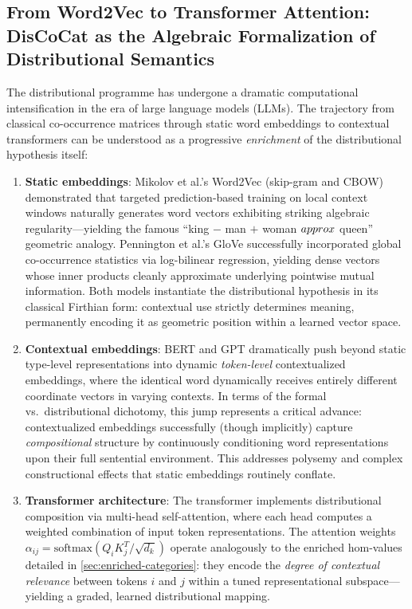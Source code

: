 \documentclass[
]{article}
\begin{document}
\subsection{From Word2Vec to Transformer Attention: DisCoCat as the
Algebraic Formalization of Distributional
Semantics}\label{from-word2vec-to-transformer-attention-discocat-as-the-algebraic-formalization-of-distributional-semantics}

The distributional programme has undergone a dramatic computational
intensification in the era of large language models (LLMs). The
trajectory from classical co-occurrence matrices through static word
embeddings to contextual transformers can be understood as a progressive
\emph{enrichment} of the distributional hypothesis itself:

\begin{enumerate}
\def\labelenumi{\arabic{enumi}.}
\item
  \textbf{Static embeddings}: Mikolov et al.'s
  \citeyearpar{mikolov2013efficient} Word2Vec (skip-gram and CBOW)
  demonstrated that targeted prediction-based training on local context
  windows naturally generates word vectors exhibiting striking algebraic
  regularity---yielding the famous ``king \(-\) man \(+\) woman
  \(\\approx\) queen'' geometric analogy. Pennington et al.'s
  \citeyearpar{pennington2014glove} GloVe successfully incorporated
  global co-occurrence statistics via log-bilinear regression, yielding
  dense vectors whose inner products cleanly approximate underlying
  pointwise mutual information. Both models instantiate the
  distributional hypothesis in its classical Firthian form: contextual
  use strictly determines meaning, permanently encoding it as geometric
  position within a learned vector space.
\item
  \textbf{Contextual embeddings}: BERT \citep{devlin2019bert} and GPT
  \citep{radford2018improving} dramatically push beyond static
  type-level representations into dynamic \emph{token-level}
  contextualized embeddings, where the identical word dynamically
  receives entirely different coordinate vectors in varying contexts. In
  terms of the formal vs.~distributional dichotomy, this jump represents
  a critical advance: contextualized embeddings successfully (though
  implicitly) capture \emph{compositional} structure by continuously
  conditioning word representations upon their full sentential
  environment. This addresses polysemy and complex constructional
  effects that static embeddings routinely conflate.
\item
  \textbf{Transformer architecture}: The transformer
  \citep{vaswani2017attention} implements distributional composition via
  multi-head self-attention, where each head computes a weighted
  combination of input token representations. The attention weights
  \(\alpha_{ij} = \mathrm{softmax}(Q_i K_j^T / \sqrt{d_k})\) operate
  analogously to the enriched hom-values detailed in
  \autoref{sec:enriched-categories}: they encode the \emph{degree of
  contextual relevance} between tokens \(i\) and \(j\) within a tuned
  representational subspace---yielding a graded, learned distributional
  mapping.
\end{enumerate}
\end{document}
